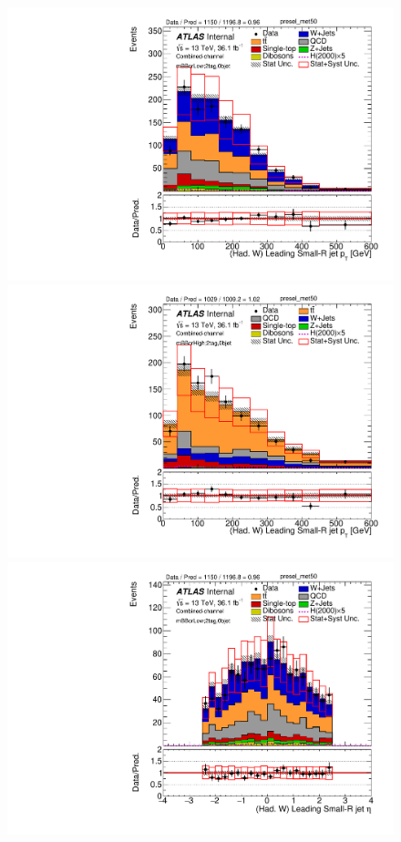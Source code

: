 \begin{figure}[!ht]
\begin{center}
\includegraphics[scale=0.33]{./figures/boosted/PlotByMbbRegions/DataMC_2tag_0bjet_mbbcrLow_lepton_presel_met50_LightJet1Pt}                                                                         
\includegraphics[scale=0.33]{./figures/boosted/PlotByMbbRegions/DataMC_2tag_0bjet_mbbcrHigh_lepton_presel_met50_LightJet1Pt}                                                                        
\includegraphics[scale=0.33]{./figures/boosted/PlotByMbbRegions/DataMC_2tag_0bjet_mbbcrLow_lepton_presel_met50_LightJet1Eta}                                                                        

\end{center}
\end{figure}
